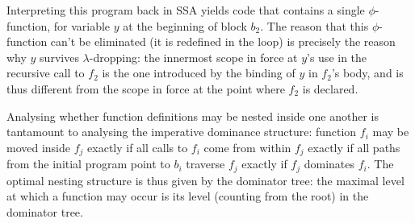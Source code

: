 Interpreting this program back in SSA yields code that
contains a single $\phi$-function, for variable $y$ at the beginning
of block $b_2$. The reason that this $\phi$-function can't be
eliminated (it is redefined in the loop) is precisely the reason why
$y$ survives $\lambda$-dropping: the innermost scope in force at $y$'s
use in the recursive call to $f_2$ is the one introduced by the
binding of $y$ in $f_2$'s body, and is thus different from the scope
in force at the point where $f_2$ is declared.

Analysing whether function definitions may be nested inside one
another is tantamount to analysing the imperative dominance structure:
function $f_i$ may be moved inside $f_j$ exactly if all calls to $f_i$
come from within $f_j$ exactly if all paths from the initial program
point to $b_i$ traverse $f_j$ exactly if $f_j$ dominates $f_i$. The
optimal nesting structure is thus given by the dominator tree: the
maximal level at which a function may occur is its level (counting
from the root) in the dominator tree.


